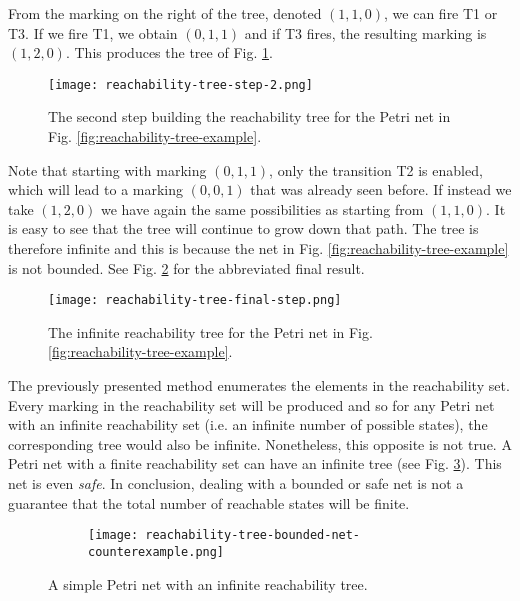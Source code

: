 \documentclass[../Thesis.tex]{subfiles}
\begin{document}
From the marking on the right of the tree, denoted $(1, 1, 0)$, we can fire T1 or T3.
If we fire T1, we obtain $(0, 1, 1)$ and if T3 fires, the resulting marking is $(1, 2, 0)$.
This produces the tree of Fig. \ref{fig:reachability-tree-step-2}.

\begin{figure}[!htb]
    \centering
    \texttt{[image: reachability-tree-step-2.png]}
    \caption{The second step building the reachability tree
        for the Petri net in Fig. \ref{fig:reachability-tree-example}.}
    \label{fig:reachability-tree-step-2}
\end{figure}

Note that starting with marking $(0, 1, 1)$, only the transition T2 is enabled,
which will lead to a marking $(0, 0, 1)$ that was already seen before.
If instead we take $(1, 2, 0)$ we have again the same possibilities as starting from $(1, 1, 0)$.
It is easy to see that the tree will continue to grow down that path.
The tree is therefore infinite and this is because
the net in Fig. \ref{fig:reachability-tree-example} is not bounded.
See Fig. \ref{fig:reachability-tree-final-step} for the abbreviated final result.

\begin{figure}[!htb]
    \centering
    \texttt{[image: reachability-tree-final-step.png]}
    \caption{The infinite reachability tree for the Petri net in Fig.
        \ref{fig:reachability-tree-example}.}
    \label{fig:reachability-tree-final-step}
\end{figure}

The previously presented method enumerates the elements in the reachability set.
Every marking in the reachability set will be produced
and so for any Petri net with an infinite reachability set
(i.e. an infinite number of possible states),
the corresponding tree would also be infinite.
Nonetheless, this opposite is not true.
A Petri net with a finite reachability set can have an infinite tree
(see Fig. \ref{fig:reachability-tree-bounded-net-counterexample}).
This net is even \emph{safe}.
In conclusion, dealing with a bounded or safe net is not
a guarantee that the total number of reachable states will be finite.

\begin{figure}[!htb]
    \centering
    \begin{subfigure}
        \centering
    \end{subfigure}
    \hspace{1.5cm}
    \begin{subfigure}
        \centering
        \texttt{[image: reachability-tree-bounded-net-counterexample.png]}
    \end{subfigure}
    \caption{A simple Petri net with an infinite reachability tree.}
    \label{fig:reachability-tree-bounded-net-counterexample}
\end{figure}
\end{document}
